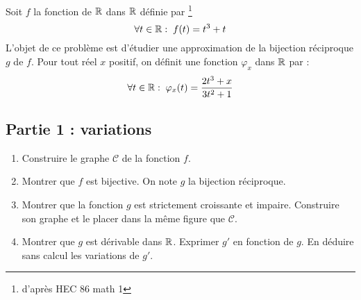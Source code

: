 Soit $f$ la fonction de $\mathbb{R}$ dans $\mathbb{R}$ définie par \footnote{d'après HEC 86 math 1}
\begin{displaymath}
 \forall t\in \mathbb{R} :\; f(t) = t^3 + t 
\end{displaymath}
L'objet de ce problème est d'étudier une approximation de la bijection réciproque $g$ de $f$.\newline
Pour tout réel $x$ positif, on définit une fonction $\varphi_x$ dans $\mathbb{R}$ par :
\begin{displaymath}
 \forall t\in \mathbb{R}:\;\varphi_x(t) = \frac{2t^3 + x}{3t^2+1}
\end{displaymath}

\subsection*{Partie 1 : variations}
\begin{enumerate}
 \item Construire le graphe $\mathcal C$ de la fonction $f$.
 \item Montrer que $f$ est bijective. On note $g$ la bijection réciproque.
 \item Montrer que la fonction $g$ est strictement croissante et impaire. Construire son graphe et le placer dans la même figure que $\mathcal C$.
 \item Montrer que $g$ est dérivable dans $\mathbb{R}$. Exprimer $g'$ en fonction de $g$. En déduire sans calcul les variations de $g'$.
\end{enumerate}

